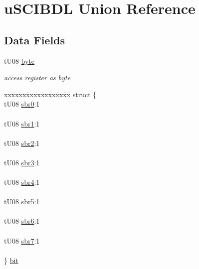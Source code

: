 \hypertarget{unionu_s_c_i_b_d_l}{}\section{u\+S\+C\+I\+B\+D\+L Union Reference}
\label{unionu_s_c_i_b_d_l}
\subsection*{Data Fields}
\begin{DoxyCompactItemize}
\item 
\hypertarget{unionu_s_c_i_b_d_l_aba308d63db050aed25cfd36c37e41ad4}{}t\+U08 \hyperlink{unionu_s_c_i_b_d_l_aba308d63db050aed25cfd36c37e41ad4}{byte}\label{unionu_s_c_i_b_d_l_aba308d63db050aed25cfd36c37e41ad4}

\begin{DoxyCompactList}\small\item\em access register as byte \end{DoxyCompactList}\item 
\hypertarget{unionu_s_c_i_b_d_l_a9f750f356e3bbf1c3570333ee59a609f}{}\begin{tabbing}
xx\=xx\=xx\=xx\=xx\=xx\=xx\=xx\=xx\=\kill
struct \{\\
\>tU08 \hyperlink{unionu_s_c_i_b_d_l_a4acb00480341ae0bca9ea360e1cf8416}{sbr0}:1\\
\>\\
\>tU08 \hyperlink{unionu_s_c_i_b_d_l_aa29cbc7c7f9d6d465036cf98be5f9811}{sbr1}:1\\
\>\\
\>tU08 \hyperlink{unionu_s_c_i_b_d_l_a891426e5ff55d5934099bfb3ab30a1b1}{sbr2}:1\\
\>\\
\>tU08 \hyperlink{unionu_s_c_i_b_d_l_aa2b785539ef75ae179d9a2043f6f540c}{sbr3}:1\\
\>\\
\>tU08 \hyperlink{unionu_s_c_i_b_d_l_aa8f0e80820819a50b0100622cee83e3d}{sbr4}:1\\
\>\\
\>tU08 \hyperlink{unionu_s_c_i_b_d_l_a676243d9a0464d543a3d098a01b15796}{sbr5}:1\\
\>\\
\>tU08 \hyperlink{unionu_s_c_i_b_d_l_a3c5744d680ffdd6ae36ac1ef09eade9a}{sbr6}:1\\
\>\\
\>tU08 \hyperlink{unionu_s_c_i_b_d_l_ab2c3faa82acc218ea95b2a0e129c1252}{sbr7}:1\\
\>\\
\} \hyperlink{unionu_s_c_i_b_d_l_a9f750f356e3bbf1c3570333ee59a609f}{bit}\label{unionu_s_c_i_b_d_l_a9f750f356e3bbf1c3570333ee59a609f}
\\


\end{tabbing}
\end{DoxyCompactItemize}
